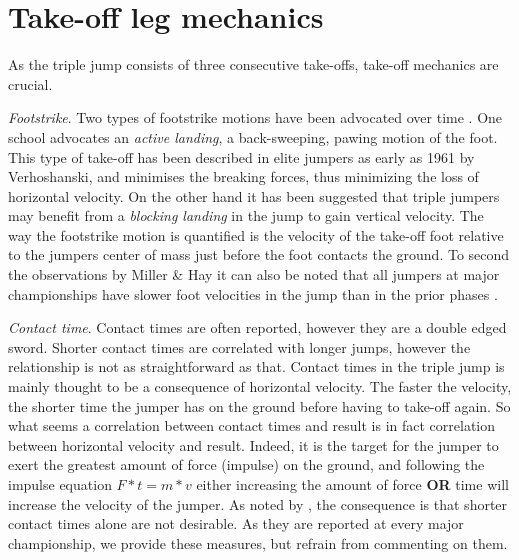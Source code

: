 \documentclass[]{scrreprt}
\begin{document}
\clearpage

\hypertarget{take-off-leg-mechanics}{%
\section{Take-off leg mechanics}\label{take-off-leg-mechanics}}

As the triple jump consists of three consecutive take-offs, take-off mechanics are crucial.

\emph{Footstrike}. Two types of footstrike motions have been advocated over time \autocite{Koh1990}. One school advocates an \emph{active landing}, a back-sweeping, pawing motion of the foot. This type of take-off has been described in elite jumpers as early as 1961 by Verhoshanski, and minimises the breaking forces, thus minimizing the loss of horizontal velocity. On the other hand it has been suggested that triple jumpers may benefit from a \emph{blocking landing} in the jump to gain vertical velocity.
The way the footstrike motion is quantified is the velocity of the take-off foot relative to the jumpers center of mass just before the foot contacts the ground. To second the observations by Miller \& Hay \autocite{Miller1986} it can also be noted that all jumpers at major championships have slower foot velocities in the jump than in the prior phases \autocites{Hommel2009}{Tucker2017}{Tucker2019}. ~

\emph{Contact time}. Contact times are often reported, however they are a double edged sword. Shorter contact times are correlated with longer jumps, however the relationship is not as straightforward as that. Contact times in the triple jump is mainly thought to be a consequence of horizontal velocity. The faster the velocity, the shorter time the jumper has on the ground before having to take-off again. So what seems a correlation between contact times and result is in fact correlation between horizontal velocity and result.
Indeed, it is the target for the jumper to exert the greatest amount of force (impulse) on the ground, and following the impulse equation \(F*t=m*v\) either increasing the amount of force \textbf{OR} time will increase the velocity of the jumper. As noted by \textcite{Hay1992}, the consequence is that shorter contact times alone are not desirable. As they are reported at every major championship, we provide these measures, but refrain from commenting on them. ~
\end{document}
